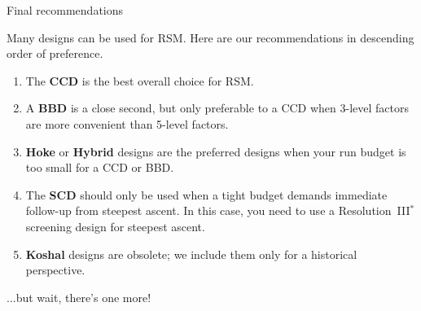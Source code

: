 \documentclass[9pt]{beamer}
\begin{document}
\begin{frame}{Final recommendations}

Many designs can be used for RSM. Here are our recommendations in descending order of preference.

\begin{enumerate}
	\item The \textbf{CCD} is the best overall choice for RSM.
	\item A \textbf{BBD} is a close second, but only preferable to a CCD when 3-level factors are more convenient than 5-level factors.
	\item \textbf{Hoke} or \textbf{Hybrid} designs are the preferred designs when your run budget is too small for a CCD or BBD.
	\item The \textbf{SCD} should only be used when a tight budget demands immediate follow-up from steepest ascent. In this case, you need to use a Resolution~III$^*$ screening design for steepest ascent.
	\item \textbf{Koshal} designs are obsolete; we include them only for a historical perspective.
\end{enumerate}

\pause
\bigskip
...but wait, there's one more!
\end{frame}
\end{document}

